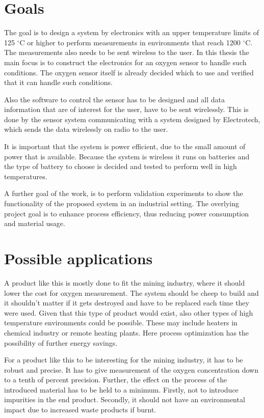 \section{Goals}

The goal is to design a system by electronics with an upper temperature limits of 125 $^{\circ}$C or higher to perform measurements in environments that reach 1200 $^{\circ}$C. The measurements also needs to be sent wireless to the user. In this thesis the main focus is to construct the electronics for an oxygen sensor to handle such conditions. The oxygen sensor itself is already decided which to use and verified that it can handle such conditions.

Also the software to control the sensor has to be designed and all data information that are of interest for the user, have to be sent wirelessly. This is done by the sensor system communicating with a system designed by Electrotech, which sends the data wirelessly on radio to the user.

It is important that the system is power efficient, due to the small amount of power that is available. Because the system is wireless it runs on batteries and the type of battery to choose is decided and tested to perform well in high temperatures.

A further goal of the work, is to perform validation experiments to show the functionality of the proposed system in an industrial setting. The overlying project goal is to enhance process efficiency, thus reducing power consumption and material usage.



\section{Possible applications}

A product like this is mostly done to fit the mining industry, where it should lower the cost for oxygen measurement. The system should be cheep to build and it shouldn't matter if it gets destroyed and have to be replaced each time they were used. Given that this type of product would exist, also other types of high temperature environments could be possible. These may include heaters in chemical industry or remote heating plants. Here process optimization has the possibility of further energy savings.

For a product like this to be interesting for the mining industry, it has to be robust and precise. It has to give measurement of the oxygen concentration down to a tenth of percent precision. Further, the effect on the process of the introduced material has to be held to a minimum. Firstly, not to introduce impurities in the end product. Secondly, it should not have an environmental impact due to increased waste products if burnt.




